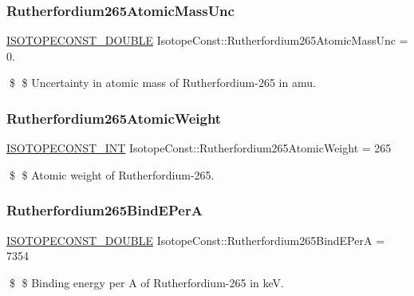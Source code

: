 \subsubsection{\texorpdfstring{Rutherfordium265\+Atomic\+Mass\+Unc}{Rutherfordium265AtomicMassUnc}}
{\footnotesize\ttfamily \mbox{\hyperlink{group___isotope_const-_macros_ga8f45a7272ce02c0b4c65c44636ed719a}{I\+S\+O\+T\+O\+P\+E\+C\+O\+N\+S\+T\+\_\+\+D\+O\+U\+B\+LE}} Isotope\+Const\+::\+Rutherfordium265\+Atomic\+Mass\+Unc = 0.}

\$ \$ Uncertainty in atomic mass of Rutherfordium-\/265 in amu. \mbox{\label{group___isotope_const-_rutherfordium-_rf265_gaae2e2af8a63d1580cefe5d6e0e1087e1}} 
\subsubsection{\texorpdfstring{Rutherfordium265\+Atomic\+Weight}{Rutherfordium265AtomicWeight}}
{\footnotesize\ttfamily \mbox{\hyperlink{group___isotope_const-_macros_ga5f18360b3e99483a35c32d789e62621c}{I\+S\+O\+T\+O\+P\+E\+C\+O\+N\+S\+T\+\_\+\+I\+NT}} Isotope\+Const\+::\+Rutherfordium265\+Atomic\+Weight = 265}

\$ \$ Atomic weight of Rutherfordium-\/265. \mbox{\label{group___isotope_const-_rutherfordium-_rf265_ga0030a13ebc6ca11bedb0b9ebfee3c7ac}} 
\subsubsection{\texorpdfstring{Rutherfordium265\+Bind\+E\+PerA}{Rutherfordium265BindEPerA}}
{\footnotesize\ttfamily \mbox{\hyperlink{group___isotope_const-_macros_ga8f45a7272ce02c0b4c65c44636ed719a}{I\+S\+O\+T\+O\+P\+E\+C\+O\+N\+S\+T\+\_\+\+D\+O\+U\+B\+LE}} Isotope\+Const\+::\+Rutherfordium265\+Bind\+E\+PerA = 7354}

\$ \$ Binding energy per A of Rutherfordium-\/265 in keV. \mbox{\label{group___isotope_const-_rutherfordium-_rf265_gae9e519edd0d5bed7f7d0bfa1f4847b3b}} 
